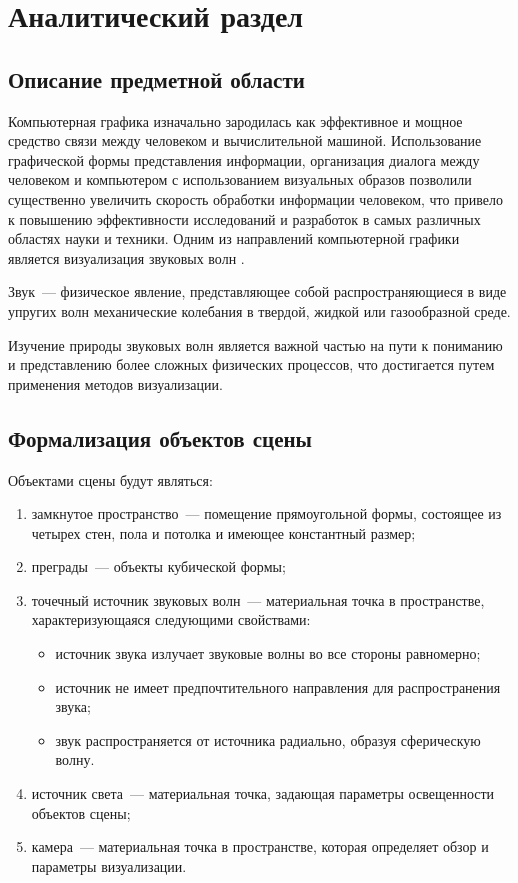 \chapter{Аналитический раздел}

\section{Описание предметной области}

Компьютерная графика изначально зародилась как эффективное и мощное средство связи между человеком и вычислительной машиной.
Использование графической формы представления информации, организация диалога между человеком и компьютером с использованием визуальных образов позволили существенно увеличить скорость обработки информации человеком, что привело к повышению эффективности исследований и разработок в самых различных областях науки и техники.
Одним из направлений компьютерной графики является визуализация звуковых волн \cite{baseGraph1, baseGraph2}.

Звук~--- физическое явление, представляющее собой распространяющиеся в виде упругих волн механические колебания в твердой, жидкой или газообразной среде.

Изучение природы звуковых волн является важной частью на пути к пониманию и представлению более сложных физических процессов, что достигается путем применения методов визуализации.

\clearpage

\section{Формализация объектов сцены}

Объектами сцены будут являться:
\begin{enumerate}
	\item замкнутое пространство~--- помещение прямоугольной формы, состоящее из четырех стен, пола и потолка и имеющее константный размер;
	\item преграды~--- объекты кубической формы;
	\item точечный источник звуковых волн~--- материальная точка в пространстве, характеризующаяся следующими свойствами:
	\begin{itemize}
		\item источник звука излучает звуковые волны во все стороны равномерно;
		\item источник не имеет предпочтительного направления для распространения звука;
		\item звук распространяется от источника радиально, образуя сферическую волну.
	\end{itemize}
	\item источник света~--- материальная точка, задающая параметры освещенности объектов сцены;
	\item камера~--- материальная точка в пространстве, которая определяет обзор и параметры визуализации.
\end{enumerate}

